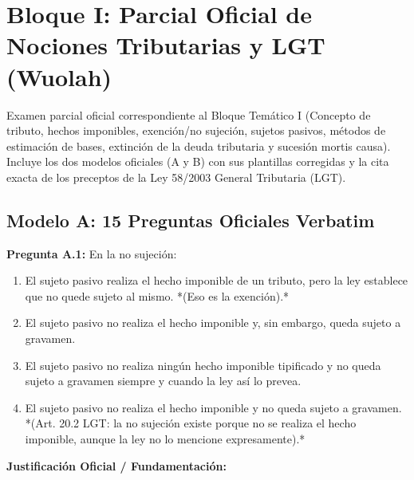 \documentclass[11pt,a4paper,openany]{article}
\begin{document}
\newpage
\tableofcontents
\newpage

\section{Bloque I: Parcial Oficial de Nociones Tributarias y LGT (Wuolah)}
\label{sec:wuolah}

\begin{enunciadoBox}
Examen parcial oficial correspondiente al Bloque Temático I (Concepto de tributo, hechos imponibles, exención/no sujeción, sujetos pasivos, métodos de estimación de bases, extinción de la deuda tributaria y sucesión mortis causa). Incluye los dos modelos oficiales (A y B) con sus plantillas corregidas y la cita exacta de los preceptos de la Ley 58/2003 General Tributaria (LGT).
\end{enunciadoBox}

\vspace{0.4cm}
\subsection{Modelo A: 15 Preguntas Oficiales Verbatim}

\noindent\textbf{\sffamily Pregunta A.1:} En la no sujeción:\\[0.15cm]
\begin{enumerate}[label=\textbf{\alph*)},leftmargin=1.8em,itemsep=1.5pt,topsep=2pt,partopsep=0pt,parsep=0pt]
    \item El sujeto pasivo realiza el hecho imponible de un tributo, pero la ley establece que no quede sujeto al mismo. *(Eso es la exención).*
    \item El sujeto pasivo no realiza el hecho imponible y, sin embargo, queda sujeto a gravamen.
    \item El sujeto pasivo no realiza ningún hecho imponible tipificado y no queda sujeto a gravamen siempre y cuando la ley así lo prevea.
    \item El sujeto pasivo no realiza el hecho imponible y no queda sujeto a gravamen. *(Art. 20.2 LGT: la no sujeción existe porque no se realiza el hecho imponible, aunque la ley no lo mencione expresamente).*
\end{enumerate}
\begin{solucionBox}
\textbf{Justificación Oficial / Fundamentación:}\\[0.1cm]

\end{solucionBox}
\vspace{0.35cm}
\end{document}
